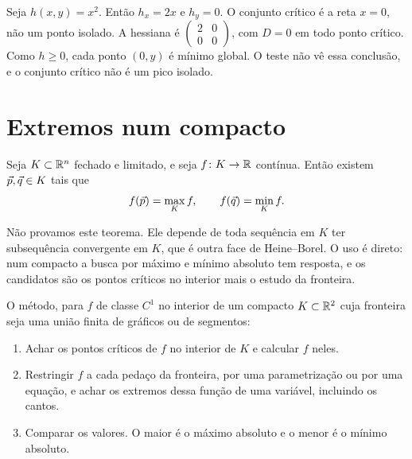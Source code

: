 \documentclass[11pt,a4paper]{article}
\begin{document}
\begin{exemplo}
Seja $h(x,y)=x^2$. Então $h_x=2x$ e $h_y=0$. O conjunto crítico é a reta $x=0$, não um ponto isolado. A hessiana é $\begin{pmatrix}2&0\\0&0\end{pmatrix}$, com $D=0$ em todo ponto crítico. Como $h\ge 0$, cada ponto $(0,y)$ é mínimo global. O teste não vê essa conclusão, e o conjunto crítico não é um pico isolado.
\end{exemplo}

\section{Extremos num compacto}

\begin{teorema}[Weierstrass em $\R^n$]
Seja $K\subset\mathbb{R}^n$ fechado e limitado, e seja $f\colon K\to\mathbb{R}$ contínua. Então existem $\vec{p},\vec{q}\in K$ tais que
\[
f(\vec{p})=\max_K f,\qquad f(\vec{q})=\min_K f.
\]
\end{teorema}

Não provamos este teorema. Ele depende de toda sequência em $K$ ter subsequência convergente em $K$, que é outra face de Heine--Borel. O uso é direto: num compacto a busca por máximo e mínimo absoluto tem resposta, e os candidatos são os pontos críticos no interior mais o estudo da fronteira.

O método, para $f$ de classe $C^1$ no interior de um compacto $K\subset\mathbb{R}^2$ cuja fronteira seja uma união finita de gráficos ou de segmentos:
\begin{enumerate}[leftmargin=1.4em]
\item Achar os pontos críticos de $f$ no interior de $K$ e calcular $f$ neles.
\item Restringir $f$ a cada pedaço da fronteira, por uma parametrização ou por uma equação, e achar os extremos dessa função de uma variável, incluindo os cantos.
\item Comparar os valores. O maior é o máximo absoluto e o menor é o mínimo absoluto.
\end{enumerate}
\end{document}
